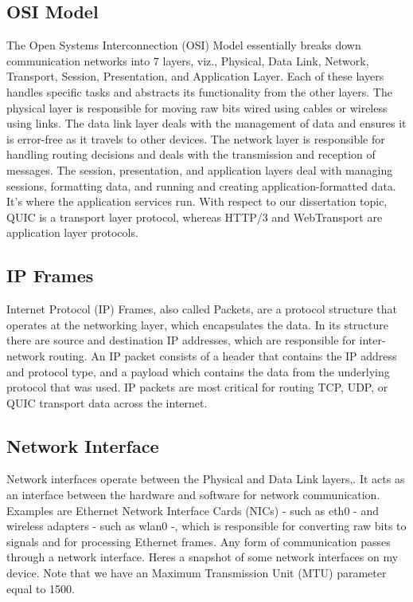 \subsection{OSI Model}
The Open Systems Interconnection (OSI) Model \cite{kurose2017} essentially breaks down communication networks into 7 layers, viz., Physical, Data Link, Network, Transport, Session, Presentation, and Application Layer. Each of these layers handles specific tasks and abstracts its functionality from the other layers. The physical layer is responsible for moving raw bits wired using cables or wireless using links. The data link layer deals with the management of data and ensures it is error-free as it travels to other devices. The network layer is responsible for handling routing decisions and deals with the transmission and reception of messages. The session, presentation, and application layers deal with managing sessions, formatting data, and running and creating application-formatted data. It's where the application services run. With respect to our dissertation topic, QUIC is a transport layer protocol, whereas HTTP/3 and WebTransport are application layer protocols.


\subsection{IP Frames}
Internet Protocol (IP) Frames, also called Packets, are a protocol structure that operates at the networking layer, which encapsulates the data. In its structure there are source and destination IP addresses, which are responsible for inter-network routing. An IP packet consists of a header that contains the IP address and protocol type, and a payload which contains the data from the underlying protocol that was used. IP packets are most critical for routing TCP, UDP, or QUIC transport data across the internet.

\subsection{Network Interface}
Network interfaces operate between the Physical and Data Link layers,. It acts as an interface between the hardware and software for network communication. Examples are Ethernet Network Interface Cards (NICs) - such as eth0 - and wireless adapters - such as wlan0 -, which is responsible for converting raw bits to signals and for processing Ethernet frames. Any form of communication passes through a network interface. Heres a snapshot of some network interfaces on my device.
Note that we have an Maximum Transmission Unit (MTU) parameter equal to 1500.

